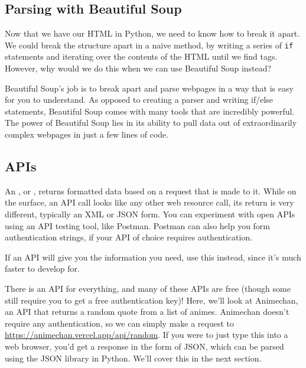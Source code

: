 \subsection{Parsing with Beautiful Soup}
Now that we have our HTML in Python, we need to know how to break it apart. We could break the structure apart in a naive method, by writing a series of \verb|if| statements and iterating over the contents of the HTML until we find tags. However, why would we do this when we can use Beautiful Soup instead?\par
Beautiful Soup's job is to break apart and parse webpages in a way that is easy for you to understand. As opposed to creating a parser and writing if/else statements, Beautiful Soup comes with many tools that are incredibly powerful. The power of Beautiful Soup lies in its ability to pull data out of extraordinarily complex webpages in just a few lines of code.\par
\subsection{APIs}
An , or , returns formatted data based on a request that is made to it. While on the surface, an API call looks like any other web resource call, its return is very different, typically an XML or JSON form. You can experiment with open APIs using an API testing tool, like Postman. Postman can also help you form authentication strings, if your API of choice requires authentication.\par
If an API will give you the information you need, use this instead, since it's much faster to develop for.\par
There is an API for everything, and many of these APIs are free (though some still require you to get a free authentication key)! Here, we'll look at Animechan, an API that returns a random quote from a list of animes. Animechan doesn't require any authentication, so we can simply make a request to \href{https://animechan.vercel.app/api/random}{https://animechan.vercel.app/api/random}. If you were to just type this into a web browser, you'd get a response in the form of JSON, which can be parsed using the JSON library in Python. We'll cover this in the next section.\par

